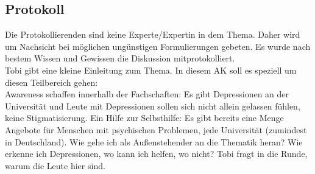   \subsection*{Protokoll}

    Die Protokollierenden sind keine Experte/Expertin in dem Thema. Daher wird um Nachsicht bei möglichen ungünstigen Formulierungen gebeten. Es wurde nach bestem Wissen und Gewissen die Diskussion mitprotokolliert. \\

    Tobi gibt eine kleine Einleitung zum Thema. In diesem AK soll es speziell um diesen Teilbereich gehen: \\

    Awareness schaffen innerhalb der Fachschaften: Es gibt Depressionen an der Universität und Leute mit Depressionen sollen sich nicht allein gelassen fühlen, keine Stigmatisierung.
    Ein Hilfe zur Selbsthilfe: Es gibt bereits eine Menge Angebote für Menschen mit psychischen Problemen, jede Universität (zumindest in Deutschland). Wie gehe ich als Außenstehender an die Thematik heran? Wie erkenne ich Depressionen, wo kann ich helfen, wo nicht?
    Tobi fragt in die Runde, warum die Leute hier sind. \\


